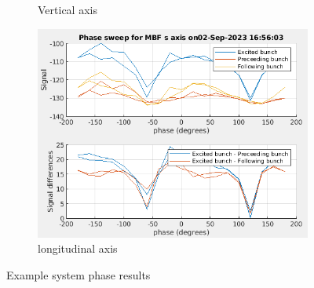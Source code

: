 \documentclass{report}
\begin{document}
\begin{figure}[hbt]
\begin{subfigure}[b]{0.45\textwidth}
        \caption{Vertical axis}
        \label{fig:system_phase_example_y}
    \end{subfigure}
    
    \begin{subfigure}[b]{0.45\textwidth}
        \includegraphics[width=\textwidth]{vlr_system_phase_scan_s.png}
        \caption{longitudinal axis}
        \label{fig:system_phase_example_z}
    \end{subfigure}
    \caption{Example system phase results}
    \label{fig:system_phase_example}
\end{figure}
\end{document}
